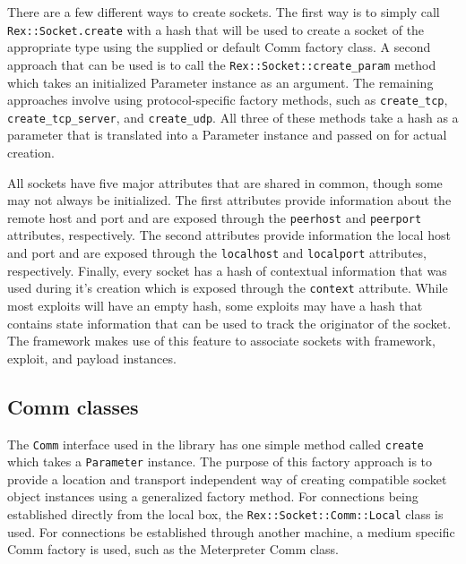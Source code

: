 \documentclass{report}
\begin{document}
\par
There are a few different ways to create sockets.  The first way is
to simply call \texttt{Rex::Socket.create} with a hash that will be
used to create a socket of the appropriate type using the supplied
or default Comm factory class.  A second approach that can be used
is to call the \texttt{Rex::Socket::create\_param} method which
takes an initialized Parameter instance as an argument.  The
remaining approaches involve using protocol-specific factory
methods, such as \texttt{create\_tcp}, \texttt{create\_tcp\_server},
and \texttt{create\_udp}.  All three of these methods take a hash as
a parameter that is translated into a Parameter instance and passed
on for actual creation.

\par
All sockets have five major attributes that are shared in common,
though some may not always be initialized.  The first attributes
provide information about the remote host and port and are exposed
through the \texttt{peerhost} and \texttt{peerport} attributes,
respectively.  The second attributes provide information the local
host and port and are exposed through the \texttt{localhost} and
\texttt{localport} attributes, respectively.  Finally, every socket
has a hash of contextual information that was used during it's
creation which is exposed through the \texttt{context} attribute.
While most exploits will have an empty hash, some exploits may have
a hash that contains state information that can be used to track the
originator of the socket.  The framework makes use of this feature
to associate sockets with framework, exploit, and payload instances.

        \subsection{Comm classes}

\par
The \texttt{Comm} interface used in the library has one simple
method called \texttt{create} which takes a \texttt{Parameter}
instance.  The purpose of this factory approach is to provide a
location and transport independent way of creating compatible socket
object instances using a generalized factory method.  For
connections being established directly from the local box, the
\texttt{Rex::Socket::Comm::Local} class is used.  For connections be
established through another machine, a medium specific Comm factory
is used, such as the Meterpreter Comm class.
\end{document}
